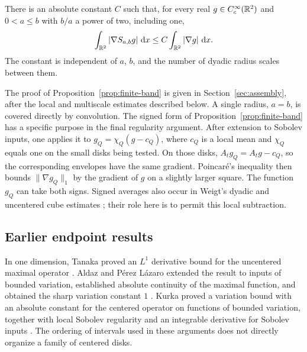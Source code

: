\begin{proposition}\label{prop:finite-band}
There is an absolute constant $C$ such that, for every real
$g\in C_c^\infty(\mathbb R^2)$ and $0<a\le b$ with $b/a$ a power of two, including one,
\begin{equation}\label{eq:intro-band}
 \int_{\mathbb R^2}|\nabla S_{a,b}g|\,\mathop{}\!\mathrm{d} x
 \le C\int_{\mathbb R^2}|\nabla g|\,\mathop{}\!\mathrm{d} x.
\end{equation}
The constant is independent of $a$, $b$, and the number of dyadic
radius scales between them.
\end{proposition}

The proof of Proposition~\ref{prop:finite-band} is given in Section~\ref{sec:assembly}, after the local and multiscale estimates described below. A single radius, $a=b$, is covered directly by convolution. The signed form of Proposition~\ref{prop:finite-band} has a specific purpose in the final regularity argument.
After extension to Sobolev inputs, one applies it to
$g_Q=\chi_Q(g-c_Q)$, where $c_Q$ is a local mean and $\chi_Q$ equals
one on the small disks being tested. On those disks,
$A_tg_Q=A_tg-c_Q$, so the corresponding envelopes have the same
gradient. Poincar\'e's inequality then bounds $\|\nabla g_Q\|_1$
by the gradient of $g$ on a slightly larger square. The function
$g_Q$ can take both signs. Signed averages also occur in Weigt's
dyadic and uncentered cube estimates
\cite{Weigt2023Dyadic,Weigt2025Cubes}; their role here is to permit
this local subtraction.

\subsection{Earlier endpoint results}

In one dimension, Tanaka proved an $L^1$ derivative bound for the
uncentered maximal operator \cite[Theorem~1]{Tanaka2002}.
Aldaz and P\'erez L\'azaro extended the result to inputs of bounded
variation, established absolute continuity of the maximal function,
and obtained the sharp variation constant $1$
\cite[Theorem~2.5]{AldazPerezLazaro2007}.
Kurka proved a variation bound with an absolute constant for the
centered operator on functions of bounded variation, together with
local Sobolev regularity and an integrable derivative for Sobolev
inputs \cite[Theorem~1.2 and Corollary~1.4]{Kurka2015}.
The ordering of intervals used in these arguments does not directly
organize a family of centered disks.

